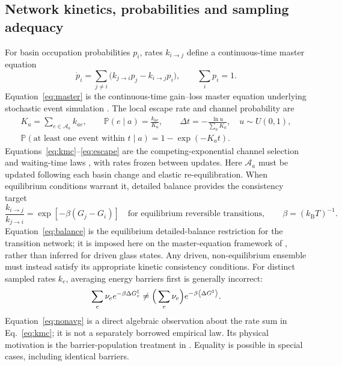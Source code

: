 \documentclass[11pt,a4paper]{article}
\begin{document}
\subsection{Network kinetics, probabilities and sampling adequacy}
For basin occupation probabilities $p_i$, rates $k_{i\to j}$ define a continuous-time master equation
\begin{equation}
 \dot p_i=\sum_{j\ne i}\big(k_{j\to i}p_j-k_{i\to j}p_i\big),\qquad
 \sum_i p_i=1.\label{eq:master}
\end{equation}
Equation~\eqref{eq:master} is the continuous-time gain--loss master equation underlying stochastic event simulation \cite{gillespie1976}.
The local escape rate and channel probability are
\begin{align}
 K_a=\sum_{e\in\mathcal A_a} k_{ae},\qquad
 \mathbb P(e\mid a)=\frac{k_{ae}}{K_a},\qquad
 \Delta t=-\frac{\ln u}{\sum_{a}K_a},\quad u\sim U(0,1),\label{eq:kmc}\\
 \mathbb P(\text{at least one event within }t\mid a)=1-\exp(-K_a t).\label{eq:escape}
\end{align}
Equations~\eqref{eq:kmc}--\eqref{eq:escape} are the competing-exponential channel selection and waiting-time laws \cite{gillespie1976}, with rates frozen between updates.
Here $\mathcal A_a$ must be updated following each basin change and elastic re-equilibration. When equilibrium conditions warrant it, detailed balance provides the consistency target
\begin{equation}
 \frac{k_{i\to j}}{k_{j\to i}}=\exp[-\beta(G_j-G_i)]\quad\text{for equilibrium reversible transitions},\qquad\beta=(k_\mathrm BT)^{-1}.\label{eq:balance}
\end{equation}
Equation~\eqref{eq:balance} is the equilibrium detailed-balance restriction for the transition network; it is imposed here on the master-equation framework of \cite{gillespie1976}, rather than inferred for driven glass states.
Any driven, non-equilibrium ensemble must instead satisfy its appropriate kinetic consistency conditions. For distinct sampled rates $k_e$, averaging energy barriers first is generally incorrect:
\begin{equation}
 \sum_e \nu_e e^{-\beta\Delta G_e^\ddagger}
 \ne \Big(\sum_e\nu_e\Big)e^{-\beta\left\langle \Delta G^\ddagger\right\rangle}.\label{eq:nonavg}
\end{equation}
Equation~\eqref{eq:nonavg} is a direct algebraic observation about the rate sum in Eq.~\eqref{eq:kmc}; it is not a separately borrowed empirical law. Its physical motivation is the barrier-population treatment in \cite{derlet2013}. Equality is possible in special cases, including identical barriers.
\end{document}
